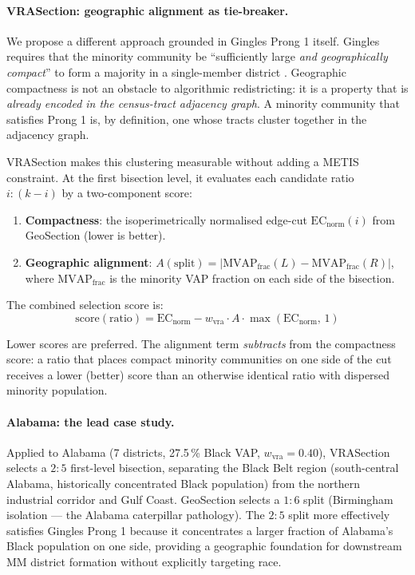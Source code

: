 \paragraph{VRASection: geographic alignment as tie-breaker.}
We propose a different approach grounded in Gingles Prong 1 itself.
Gingles requires that the minority community be ``sufficiently large
\emph{and geographically compact}'' to form a majority in a single-member
district \citep{gingles1986}.
Geographic compactness is not an obstacle to algorithmic redistricting:
it is a property that is \emph{already encoded in the census-tract adjacency
graph}.
A minority community that satisfies Prong 1 is, by definition, one whose
tracts cluster together in the adjacency graph.

VRASection makes this clustering measurable without adding a METIS constraint.
At the first bisection level, it evaluates each candidate ratio $i:(k-i)$
by a two-component score:

\begin{enumerate}
\item \textbf{Compactness}: the isoperimetrically normalised edge-cut
  $\mathrm{EC}_\text{norm}(i)$ from GeoSection \citep{b8paper} (lower is better).
\item \textbf{Geographic alignment}: $A(\text{split}) = |\mathrm{MVAP}_\text{frac}(L)
  - \mathrm{MVAP}_\text{frac}(R)|$, where $\mathrm{MVAP}_\text{frac}$ is the
  minority VAP fraction on each side of the bisection.
\end{enumerate}

The combined selection score is:
\[
  \text{score}(\text{ratio}) = \mathrm{EC}_{\text{norm}}
  - w_\text{vra} \cdot A \cdot \max(\mathrm{EC}_{\text{norm}},\, 1)
\]

Lower scores are preferred.
The alignment term \emph{subtracts} from the compactness score: a ratio
that places compact minority communities on one side of the cut receives
a lower (better) score than an otherwise identical ratio with dispersed
minority population.

\paragraph{Alabama: the lead case study.}
Applied to Alabama (7 districts, 27.5\,\% Black VAP, $w_\text{vra} = 0.40$),
VRASection selects a $2:5$ first-level bisection, separating the Black Belt
region (south-central Alabama, historically concentrated Black population)
from the northern industrial corridor and Gulf Coast.
GeoSection selects a $1:6$ split (Birmingham isolation --- the Alabama
caterpillar pathology).
The $2:5$ split more effectively satisfies Gingles Prong 1 because it
concentrates a larger fraction of Alabama's Black population on one side,
providing a geographic foundation for downstream MM district formation
without explicitly targeting race.

